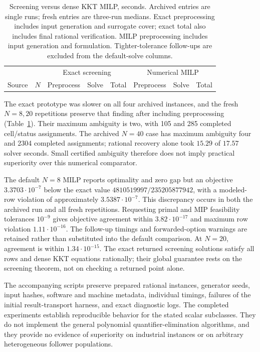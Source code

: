 \begin{table}[t]
\centering\small
\caption{Screening versus dense KKT MILP, seconds. Archived entries are single
runs; fresh entries are three-run medians. Exact preprocessing includes input
generation and surrogate cover; exact total also includes final rational
verification. MILP preprocessing includes input generation and formulation.
Tighter-tolerance follow-ups are excluded from the default-solve columns.}
\label{tab:screening-negative}
\begin{tabular}{llrrrrrr}\toprule
 & &\multicolumn{3}{c}{Exact screening}&\multicolumn{3}{c}{Numerical MILP}\\
Source&$N$&Preprocess&Solve&Total&Preprocess&Solve&Total\\\midrule
\end{tabular}
\end{table}

The exact prototype was slower on all four archived instances, and the fresh
$N=8,20$ repetitions preserve that finding after including preprocessing
(Table~\ref{tab:screening-negative}). Their maximum ambiguity is two, with
105 and 285 completed cell/status assignments. The archived $N=40$ case has
maximum ambiguity four and 2304 completed assignments; rational recovery alone
took $15.29$ of $17.57$ solver seconds. Small certified ambiguity therefore
does not imply practical superiority over this numerical comparator.

The default $N=8$ MILP reports optimality and zero gap but an objective
$3.3703\cdot10^{-7}$ below the exact value
$4810519997/235205877942$, with a modeled-row violation of approximately
$3.5387\cdot10^{-7}$. This discrepancy occurs in both the archived run and
all fresh repetitions. Requesting primal and MIP feasibility tolerances
$10^{-9}$ gives objective agreement within $3.82\cdot10^{-17}$ and maximum
row violation $1.11\cdot10^{-16}$. The follow-up timings and forwarded-option
warnings are retained rather than substituted into the default comparison.
At $N=20$, agreement is within $1.34\cdot10^{-15}$. The exact returned
screening solutions satisfy all rows and dense KKT equations rationally;
their global guarantee rests on the screening theorem, not on checking a
returned point alone.

The accompanying scripts preserve prepared rational instances, generator seeds,
input hashes, software and machine metadata, individual timings, failures of
the initial result-transport harness, and exact diagnostic logs. The completed
experiments establish reproducible behavior for the stated scalar subclasses.
They do not implement the general polynomial quantifier-elimination algorithms,
and they provide no evidence of superiority on industrial instances or on
arbitrary heterogeneous follower populations.
